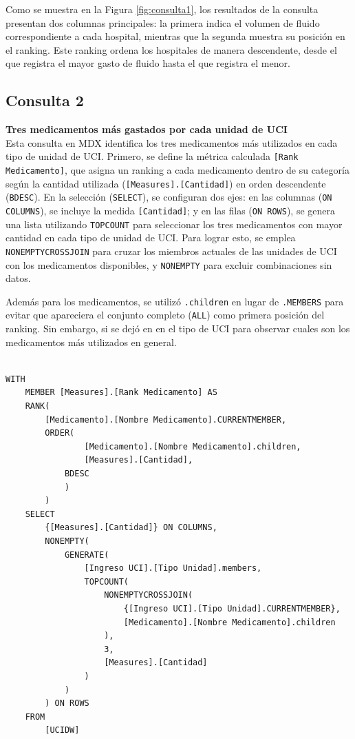 \documentclass{article}
\begin{document}
Como se muestra en la Figura \ref{fig:consulta1}, los resultados de la consulta presentan dos columnas principales: la primera indica el volumen de fluido correspondiente a cada hospital, mientras que la segunda muestra su posición en el ranking. Este ranking ordena los hospitales de manera descendente, desde el que registra el mayor gasto de fluido hasta el que registra el menor.


\subsection{Consulta 2}

\textbf{Tres medicamentos más gastados por cada unidad de UCI}
\\

Esta consulta en MDX identifica los tres medicamentos más utilizados en cada tipo de unidad de UCI. Primero, se define la métrica calculada \texttt{[Rank Medicamento]}, que asigna un ranking a cada medicamento dentro de su categoría según la cantidad utilizada (\texttt{[Measures].[Cantidad]}) en orden descendente (\texttt{BDESC}). En la selección (\texttt{SELECT}), se configuran dos ejes: en las columnas (\texttt{ON COLUMNS}), se incluye la medida \texttt{[Cantidad]}; y en las filas (\texttt{ON ROWS}), se genera una lista utilizando \texttt{TOPCOUNT} para seleccionar los tres medicamentos con mayor cantidad en cada tipo de unidad de UCI. Para lograr esto, se emplea \texttt{NONEMPTYCROSSJOIN} para cruzar los miembros actuales de las unidades de UCI con los medicamentos disponibles, y \texttt{NONEMPTY} para excluir combinaciones sin datos. 

Además para los medicamentos, se utilizó \texttt{.children} en lugar de \texttt{.MEMBERS} para evitar que apareciera el conjunto completo (\texttt{ALL}) como primera posición del ranking. Sin embargo, si se dejó en en el tipo de UCI para observar cuales son los medicamentos más utilizados en general.
\\

\begin{lstlisting}[style=ddlstyle, label=lst:consulta2,caption=Consulta 2: Tres medicamentos más gastados por cada unidad de UCI]
	
WITH 
	MEMBER [Measures].[Rank Medicamento] AS 
	RANK(
		[Medicamento].[Nombre Medicamento].CURRENTMEMBER,
		ORDER(
				[Medicamento].[Nombre Medicamento].children,
				[Measures].[Cantidad], 
			BDESC
			)
		)
	SELECT 
		{[Measures].[Cantidad]} ON COLUMNS, 
		NONEMPTY(
			GENERATE(
				[Ingreso UCI].[Tipo Unidad].members,
				TOPCOUNT(
					NONEMPTYCROSSJOIN(
						{[Ingreso UCI].[Tipo Unidad].CURRENTMEMBER}, 
						[Medicamento].[Nombre Medicamento].children
					), 
					3, 
					[Measures].[Cantidad]
				)
			)
		) ON ROWS
	FROM 
		[UCIDW]
\end{lstlisting}
\end{document}
